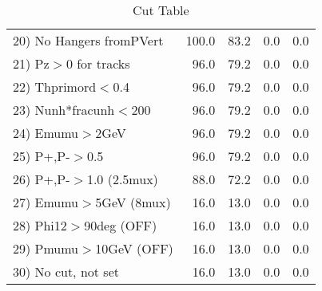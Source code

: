 \begin{table}[h!]
\begin{tabular}{||l||r|r|r|r||}
 20) No Hangers fromPVert &       100.0 &        83.2 &         0.0 &         0.0 \\
 21) Pz$>$0 for tracks    &        96.0 &        79.2 &         0.0 &         0.0 \\
 22) Thprimord$<$0.4      &        96.0 &        79.2 &         0.0 &         0.0 \\
 23) Nunh*fracunh$<$200   &        96.0 &        79.2 &         0.0 &         0.0 \\
 24) Emumu$>$2GeV         &        96.0 &        79.2 &         0.0 &         0.0 \\
 25) P+,P-$>$0.5          &        96.0 &        79.2 &         0.0 &         0.0 \\
 26) P+,P-$>$1.0 (2.5mux) &        88.0 &        72.2 &         0.0 &         0.0 \\
 27) Emumu$>$5GeV  (8mux) &        16.0 &        13.0 &         0.0 &         0.0 \\
 28) Phi12$>$90deg  (OFF) &        16.0 &        13.0 &         0.0 &         0.0 \\
 29) Pmumu$>$10GeV  (OFF) &        16.0 &        13.0 &         0.0 &         0.0 \\
 30) No cut, not set      &        16.0 &        13.0 &         0.0 &         0.0 \\
 \hline
 \hline
 \end{tabular}
 \caption{Cut Table \cohjp  }
 \label{tab-cut__jpsi}
 \end{table}
